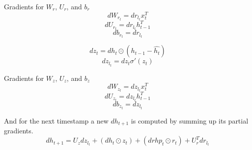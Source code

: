 \documentclass[11pt]{article}
\begin{document}
			Gradients for $W_r$, $U_r$, and $b_r$
			\begin{equation}
				dW_{r_t} = dr_{l_t} x_t^T
			\end{equation}
			\begin{equation}
				dU_{r_t} = dr_{l_t} h_{t-1}^T
			\end{equation}
			\begin{equation}
				db_{r_t} = dr_{l_t}
			\end{equation}
			
			\begin{equation}
				dz_t = dh_t \odot (h_{t-1} - \hat{h_t})
			\end{equation}
			\begin{equation}
				dz_{l_t} = dz_t \sigma'(z_t)
			\end{equation}
		
			
			Gradients for $W_z$, $U_z$, and $b_z$
			\begin{equation}
				dW_{z_t} = dz_{l_t} x_t^T
			\end{equation}
			\begin{equation}
				dU_{z_t} = dz_{l_t} h_{t-1}^T
			\end{equation}
			\begin{equation}
				db_{z_t} = dz_{l_t}
			\end{equation}
		
			And for the next timestamp a new $dh_{t+1}$ is computed by summing up its partial gradients.
			\begin{equation}				
				dh_{t+1} = U_z dz_{l_t} + (dh_t \odot z_t) + (drhp_t \odot r_t) + U_r^T dr_{l_t}
			\end{equation}
				
\end{document}
